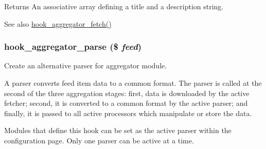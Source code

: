 \begin{DoxyReturn}{Returns}
An associative array defining a title and a description string.
\end{DoxyReturn}
\begin{DoxySeeAlso}{See also}
\hyperlink{group__hooks_ga459db08cc062e9ea3bf1f526daf91a4a}{hook\_\-aggregator\_\-fetch()} 
\end{DoxySeeAlso}
\hypertarget{group__hooks_gae27163e729bb531cc527ec6f0ad16943}{
\subsubsection[{hook\_\-aggregator\_\-parse}]{\setlength{\rightskip}{0pt plus 5cm}hook\_\-aggregator\_\-parse (\$ {\em feed})}}
\label{group__hooks_gae27163e729bb531cc527ec6f0ad16943}
Create an alternative parser for aggregator module.

A parser converts feed item data to a common format. The parser is called at the second of the three aggregation stages: first, data is downloaded by the active fetcher; second, it is converted to a common format by the active parser; and finally, it is passed to all active processors which manipulate or store the data.

Modules that define this hook can be set as the active parser within the configuration page. Only one parser can be active at a time.


